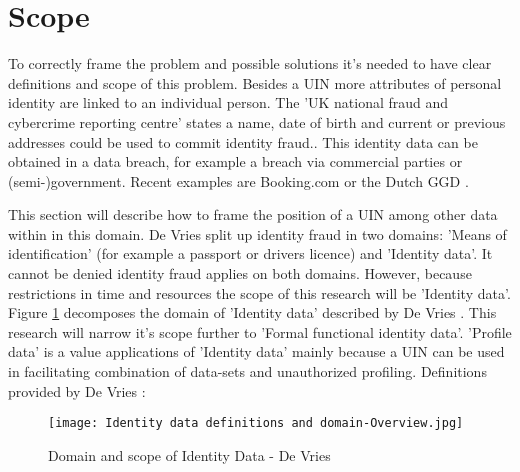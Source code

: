 \section{Scope} \label{scope}
To correctly frame the problem and possible solutions it's needed to have clear definitions and scope of this problem. Besides a UIN more attributes of personal identity are linked to an individual person. The 'UK national fraud and cybercrime reporting centre' states a name, date of birth and current or previous addresses could be used to commit identity fraud.\cite{Action_fraud}. This identity data can be obtained in a data breach, for example a breach via commercial parties or (semi-)government. Recent examples are Booking.com \cite{Booking_databreach} or the Dutch GGD \cite{GGD_databreach}.

This section will describe how to frame the position of a UIN among other data within in this domain.
De Vries \etal \cite{Vries2007IdentiteitsfraudeEA} split up identity fraud in two domains: 'Means of identification' (for example a passport or drivers licence) and 'Identity data'. It cannot be denied identity fraud applies on both domains. However, because restrictions in time and resources the scope of this research will be 'Identity data'.
Figure \ref{fig:ID_domain} decomposes the domain of 'Identity data' described by De Vries \etal. This research will narrow it's scope further to 'Formal functional identity data'. 'Profile data' is a value applications of 'Identity data' mainly because a UIN can be used in facilitating combination of data-sets and unauthorized profiling. Definitions provided by De Vries \etal: 
\graphicspath{ {./images/} }
\begin{figure}
\texttt{[image: Identity data definitions and domain-Overview.jpg]}\\
\caption{Domain and scope of Identity Data - De Vries \etal \cite{Vries2007IdentiteitsfraudeEA}}
\label{fig:ID_domain}
\end{figure}
